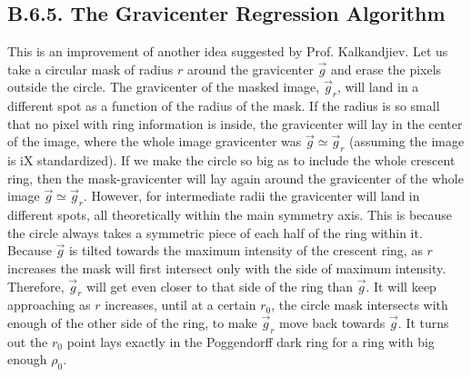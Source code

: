 \documentclass[11pt, a4paper, twoside]{article} %
\begin{document}
\vspace{-0.35cm}



\subsection*{B.6.5. The Gravicenter Regression Algorithm}\vspace{-0.15cm}
This is an improvement of another idea suggested by Prof. Kalkandjiev. Let us take a circular mask of radius $r$ around the gravicenter $\vec{g}$ and erase the pixels outside the circle. The gravicenter of the masked image, $\vec{g}_r$, will land in a different spot as a function of the radius of the mask. If the radius is so small that no pixel with ring information is inside, the gravicenter will lay in the center of the image, where the whole image gravicenter was $\vec{g}\simeq\vec{g}_r$ (assuming the image is iX standardized). If we make the circle so big as to include the whole crescent ring, then the mask-gravicenter will lay again around the gravicenter of the whole image $\vec{g}\simeq\vec{g}_r$. However, for intermediate radii the gravicenter will land in different spots, all theoretically within the main symmetry axis. This is because the circle always takes a symmetric piece of each half of the ring within it. Because $\vec{g}$ is tilted towards the maximum intensity of the crescent ring, as $r$ increases the mask will first intersect only with the side of maximum intensity. Therefore, $\vec{g}_r$ will get even closer to that side of the ring than $\vec{g}$. It will keep approaching as $r$ increases, until at a certain $r_0$, the circle mask intersects with enough of the other side of the ring, to make $\vec{g}_r$ move back towards $\vec{g}$. It turns out the $r_0$ point lays exactly in the Poggendorff dark ring for a ring with big enough $\rho_0$. 
\end{document}
